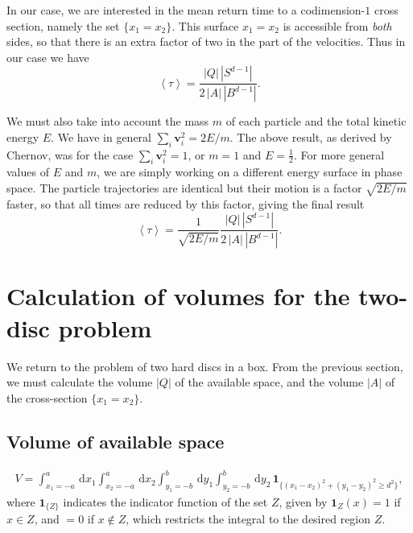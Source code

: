 \documentclass[a4paper,10pt]{article}
\newcommand{\mean}[1]{\left \langle #1 \right \rangle}
\newcommand{\rd}{\, \mathrm{d}}
\newcommand{\vv}{\mathbf{v}}
\newcommand{\indicator}[1]{\mathbf{1}_{ \{   #1 \} } }
\begin{document}
In our case, we are interested in the mean return time to a codimension-$1$ cross section, namely the set $\{x_1 = x_2\}$.
This surface $x_1=x_2$ is accessible from \emph{both} sides, so that there is an extra factor of two in the part of the velocities. Thus in our case we have
\begin{equation}
 \mean{\tau} = \frac{|Q| \, |S^{d-1}|} {2 \, |A| \, |B^{d-1}|}.	
\end{equation}

We must also take into account the mass $m$ of each particle and the total kinetic energy $E$.
We have in general $\sum_i \vv_i^2 = 2E / m$.
The above result, as derived by Chernov, was for the case $\sum_i \vv_i^2 = 1$, or $m=1$ and $E=\frac{1}{2}$.  For more general values of $E$ and $m$, we are simply working on a different energy surface in phase space. The particle trajectories are identical but their motion is a factor
$\sqrt{2E/m}$ faster, so that all times are reduced by this factor, giving the final result
\begin{equation}
  \mean{\tau} = \frac{1}{\sqrt{2E / m}} \frac{|Q| \, |S^{d-1}|} {2 \, |A| \, |B^{d-1}|}.	
\end{equation}


\section{Calculation of volumes for the two-disc problem}
We return to the problem of two hard discs in a box. From the previous section, we must calculate the volume $|Q|$ of the available space, and the volume $|A|$ of the cross-section $\{x_1 = x_2\}$.

\subsection{Volume of available space}
\begin{align}
 V = \int_{x_1 = -a}^a \rd x_1 \int_{x_2 = -a}^a \rd x_2 
\int_{y_1 = -b}^b \rd y_1 \int_{y_2 = -b}^b \rd y_2 \, \indicator{ (x_1-x_2)^2 + (y_1-y_2)^2 \ge d^2 },
\end{align}
where $\indicator{Z}$ indicates the indicator function of the set $Z$, given by $\mathbf{1}_Z (x) = 1$ if $x \in Z$, and $=0$ if $x \notin Z$, which restricts the integral to the desired region $Z$.
\end{document}
